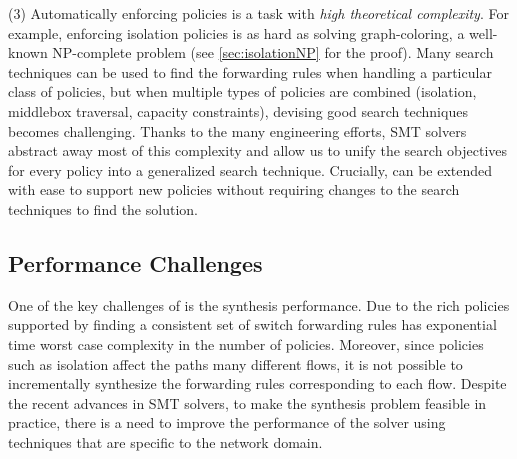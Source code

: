 (3) Automatically enforcing policies is a task with
\emph{high theoretical complexity}. 
For example, enforcing isolation policies
is as hard as solving
graph-coloring, a well-known
NP-complete problem (see \cref{sec:isolationNP} for the proof).
Many search techniques can be used to find the forwarding rules when
handling a particular class of policies, but when multiple types of
policies are combined (isolation, middlebox traversal, capacity
constraints), devising good search techniques becomes challenging.
Thanks to the many engineering efforts, SMT solvers abstract away most
of this complexity and allow us to unify the search objectives for
every policy into a generalized search technique.
Crucially, \Name can be extended with ease to
support new policies without requiring changes to the search
techniques to find the solution.

\subsection{Performance Challenges} \label{sec:performance}

One of the key challenges of \Name is the synthesis
performance. 
Due to the rich  policies supported by \Name
finding a consistent set of switch forwarding rules 
has exponential time worst case complexity in
the number of policies.
Moreover, since policies such as isolation affect
the paths many different flows, it is not possible to incrementally synthesize
the forwarding rules corresponding to each flow. 
Despite the recent advances in SMT solvers, to make
the synthesis problem feasible in practice,
there is a need to improve the performance of the solver
using techniques that are specific to the network domain.


